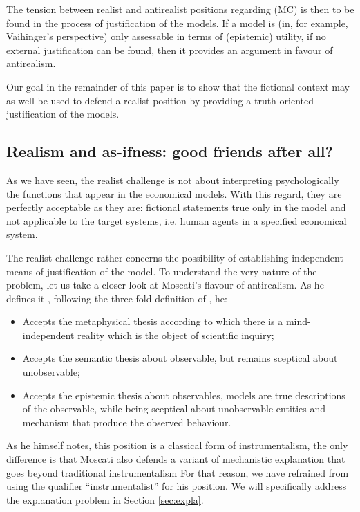 \documentclass[a4paper,11pt]{article}
\theoremstyle{definition}
\begin{document}
The tension between realist and antirealist positions regarding (MC) is then to be found in the process of justification of the models. If a model is (in, for example, Vaihinger's perspective) only assessable in terms of (epistemic) utility, if no external justification can be found, then it provides an argument in favour of antirealism.

Our goal in the remainder of this paper is to show that the fictional context may as well be used to defend a realist position by providing a truth-oriented justification of the models.


\subsection{Realism and as-ifness: good friends after all?}

As we have seen, the realist challenge is not about interpreting psychologically the functions that appear in the economical models. With this regard, they are perfectly acceptable as they are: fictional statements true only in the model and not applicable to the target systems, i.e. human agents in a specified economical system.

The realist challenge rather concerns the possibility of establishing independent means of justification of the model. To understand the very nature of the problem, let us take a closer look at Moscati's flavour of antirealism. As he defines it \citep[pp.~18-20]{Moscati2023}, following the three-fold definition of \citep{Psillos1999}, he:

\begin{itemize}
    \item Accepts the metaphysical thesis according to which there is a mind-independent reality which is the object of scientific inquiry;
    \item Accepts the semantic thesis about observable, but remains sceptical about unobservable;
    \item Accepts the epistemic thesis about observables, models are true descriptions of the observable, while being sceptical about unobservable entities and mechanism that produce the observed behaviour.
\end{itemize}

As he himself notes, this position is a classical form of instrumentalism, the only difference is that Moscati also defends a variant of mechanistic explanation that goes beyond traditional instrumentalism For that reason, we have refrained from using the qualifier ``instrumentalist'' for his position. We will specifically address the explanation problem in Section \ref{sec:expla}.
\end{document}
